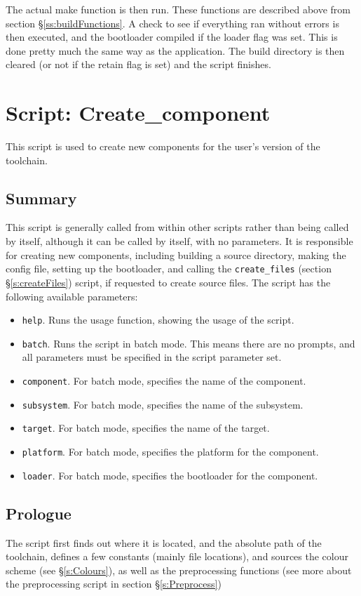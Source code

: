 \documentclass[a4paper, oneside, 11pt, titlepage, onecolumn, openright]{report}
\begin{document}
			The actual make function is then run. These functions are described above from section \S\ref{ss:buildFunctions}.			
			A check to see if everything ran without errors is then executed, and the bootloader compiled if the loader flag was set. This is done pretty much the same way as the application.
			The build directory is then cleared (or not if the retain flag is set) and the script finishes.
			

\section{Script: Create\_component}
			\label{s:createComponent}
			This script is used to create new components for the user's version of the toolchain.
			
\subsection{Summary}
			\label{ss:crecompSummary}
			This script is generally called from within other scripts rather than being called by itself, although it can be called by itself, with no parameters. It is responsible for creating new components, including building a source directory, making the config file, setting up the bootloader, and calling the \texttt{create\_files} (section \S\ref{s:createFiles}) script, if requested to create source files.
			The script has the following available parameters:
			
\begin{itemize}
\item \texttt{help}. Runs the usage function, showing the usage of the script.
\item \texttt{batch}. Runs the script in batch mode. This means there are no prompts, and all parameters must be specified in the script parameter set.
\item \texttt{component}. For batch mode, specifies the name of the component.
\item \texttt{subsystem}. For batch mode, specifies the name of the subsystem.
\item \texttt{target}. For batch mode, specifies the name of the target.
\item \texttt{platform}. For batch mode, specifies the platform for the component.
\item \texttt{loader}. For batch mode, specifies the bootloader for the component.
\end{itemize}
			
\subsection{Prologue}
			\label{ss:crecompPrologue}
			The script first finds out where it is located, and the absolute path of the toolchain, defines a few constants (mainly file locations), and sources the colour scheme (see \S\ref{s:Colours}), as well as the preprocessing functions (see more about the preprocessing script in section \S\ref{s:Preprocess})
			
\end{document}
